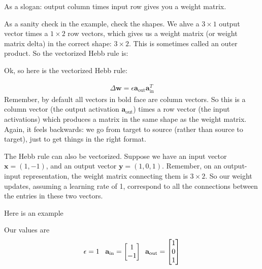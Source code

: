  As a slogan: output column times input row gives you a weight matrix.

As a sanity check in the example, check the shapes. We ahve a $3 \times 1$ output vector times a $1 \times 2$ row vectors, which gives us a weight matrix (or weight matrix delta) in the correct shape: $3 \times 2$. This is sometimes called an outer product.
So the vectorized Hebb rule is: 


Ok, so here is the vectorized Hebb rule:

\begin{eqnarray*}
\Delta \mathbf{w}  = \epsilon \mathbf{a}_{\text{out}} \mathbf{a}_{\text{in}} ^T
\end{eqnarray*}
Remember, by default all vectors in bold face are column vectors.  So this is a column vector (the output activation  $\mathbf{a}_{\text{out}}$) times a row vector (the input activations) which produces a matrix in the same shape as the weight matrix. Again, it feels backwards: we go from target to source (rather than source to target), just to get things in the right format.

The Hebb rule can also be vectorized. Suppose we have an input vector $\mathbf{x} = (1, -1)$, and an output vector $\mathbf{y} = (1,0,1)$. Remember, on an output-input representation, the weight matrix connecting them is $3 \times 2$. So our weight updates, assuming a learning rate of 1, correspond to all the connections between the entries in these two vectors. 

Here is an example


Our values are
\begin{equation*}
\epsilon = 1 \; \; \; \; \\
\mathbf{a}_{\text{in}} = \begin{bmatrix} 1 \\ -1 \end{bmatrix} \\ 
\; \; \mathbf{a}_{\text{out}} = \begin{bmatrix} 1 \\ 0 \\ 1 \end{bmatrix}
\end{equation*}

